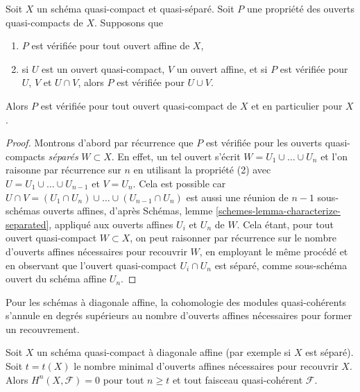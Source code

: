 \begin{lemma}
\label{lemma-induction-principle}
\begin{reference}
\cite[Proposition 3.3.1]{BvdB}
\end{reference}
Soit $X$ un schéma quasi-compact et quasi-séparé. Soit $P$ une propriété
des ouverts quasi-compacts de $X$. Supposons que
\begin{enumerate}
\item $P$ est vérifiée pour tout ouvert affine de $X$,
\item si $U$ est un ouvert quasi-compact, $V$ un ouvert affine, et si
$P$ est vérifiée pour $U$, $V$ et $U \cap V$, alors
$P$ est vérifiée pour $U \cup V$.
\end{enumerate}
Alors $P$ est vérifiée pour tout ouvert quasi-compact de $X$
et en particulier pour $X$.
\end{lemma}

\begin{proof}
Montrons d'abord par récurrence que $P$ est vérifiée pour les ouverts quasi-compacts {\it séparés}
$W \subset X$. En effet, un tel ouvert s'écrit
$W = U_1 \cup \ldots \cup U_n$ et l'on raisonne par récurrence sur $n$ en utilisant
la propriété (2) avec $U = U_1 \cup \ldots \cup U_{n - 1}$ et $V = U_n$.
Cela est possible car
$U \cap V = (U_1 \cap U_n) \cup \ldots \cup (U_{n - 1} \cap U_n)$
est aussi une réunion de $n - 1$ sous-schémas ouverts affines, d'après
Schémas, lemme \ref{schemes-lemma-characterize-separated},
appliqué aux ouverts affines $U_i$ et $U_n$ de $W$.
Cela étant, pour tout ouvert quasi-compact $W \subset X$, on
peut raisonner par récurrence sur le nombre d'ouverts affines nécessaires pour recouvrir $W$,
en employant le même procédé et en observant que l'ouvert quasi-compact
$U_i \cap U_n$ est séparé, comme sous-schéma ouvert du schéma affine $U_n$.
\end{proof}

\begin{lemma}
\label{lemma-vanishing-nr-affines}
\begin{slogan}
Pour les schémas à diagonale affine, la cohomologie des
modules quasi-cohérents s'annule en degrés supérieurs au nombre d'ouverts affines
nécessaires pour former un recouvrement.
\end{slogan}
Soit $X$ un schéma quasi-compact à diagonale affine (par exemple
si $X$ est séparé).
Soit $t = t(X)$ le nombre minimal d'ouverts affines nécessaires pour
recouvrir $X$. Alors $H^n(X, \mathcal{F}) = 0$ pour tout $n \geq t$ et tout
faisceau quasi-cohérent $\mathcal{F}$.
\end{lemma}


